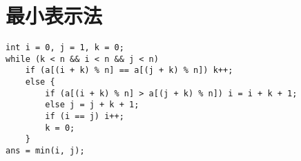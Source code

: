 \section{最小表示法}

\begin{verbatim}
int i = 0, j = 1, k = 0;
while (k < n && i < n && j < n)
    if (a[(i + k) % n] == a[(j + k) % n]) k++;
    else {
        if (a[(i + k) % n] > a[(j + k) % n]) i = i + k + 1;
        else j = j + k + 1;
        if (i == j) i++;
        k = 0;
    }
ans = min(i, j);
\end{verbatim}